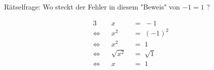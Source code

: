 Rätselfrage: Wo steckt der Fehler in diesem "Beweis" von $-1=1$ ?

\begin{alignat*}{3}
     &&x          \; &= \; -1       \\
\iff &&x^2        \; &= \; (-1)^2   \\
\iff &&x^2        \; &= \; 1        \\
\iff &&\sqrt{x^2} \; &= \; \sqrt{1} \\
\iff &&x          \; &= \; 1
\end{alignat*}

